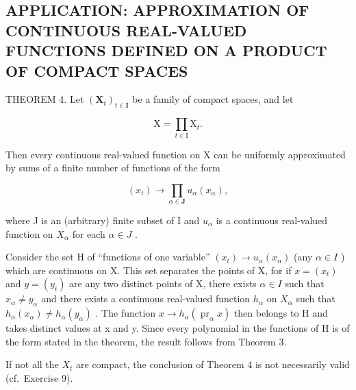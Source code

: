 \subsection{APPLICATION: APPROXIMATION OF CONTINUOUS REAL-VALUED FUNCTIONS DEFINED ON A PRODUCT OF COMPACT SPACES}

THEOREM 4. Let \((\mathbf{X}_t)_{t\in \mathbf{I}}\) be a family of compact spaces, and let

\[
\mathrm{X} = \prod_ {t \in \mathrm{I}} \mathrm{X} _ {t}.
\]

Then every continuous real-valued function on X can be uniformly approximated by sums of a finite number of functions of the form

\[
(x _ {t}) \rightarrow \prod_ {\alpha \in \mathbf {J}} u _ {\alpha} (x _ {\alpha}),
\]

where J is an (arbitrary) finite subset of I and \(u_{\alpha}\) is a continuous real-valued function on \(X_{\alpha}\) for each \(\alpha \in J\) .

Consider the set H of ``functions of one variable'' \((x_{t}) \rightarrow u_{\alpha}(x_{\alpha})\) (any \(\alpha \in I\) ) which are continuous on X. This set separates the points of X, for if \(x = (x_{t})\) and \(y = (y_{t})\) are any two distinct points of X, there exists \(\alpha \in I\) such that \(x_{\alpha} \neq y_{\alpha}\) and there exists a continuous real-valued function \(h_{\alpha}\) on \(X_{\alpha}\) such that \(h_{\alpha}(x_{\alpha}) \neq h_{\alpha}(y_{\alpha})\) . The function \(x \rightarrow h_{\alpha}(\operatorname{pr}_{\alpha} x)\) then belongs to H and takes distinct values at x and y. Since every polynomial in the functions of H is of the form stated in the theorem, the result follows from Theorem 3.

If not all the \(X_{t}\) are compact, the conclusion of Theorem 4 is not necessarily valid (cf.~Exercise 9).

